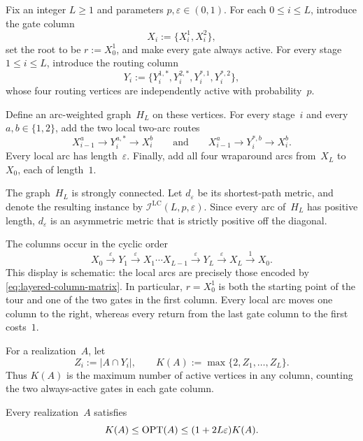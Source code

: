 \documentclass[12pt,a4paper,oneside]{report}
\begin{document}
\begin{construction}\label{con:layered-column}
Fix an integer $L\ge1$ and parameters $p,\varepsilon\in(0,1)$.  For each
$0\le i\le L$, introduce the gate column
\[
    X_i:=\{X_i^1,X_i^2\},
\]
set the root to be $r:=X_0^1$, and make every gate always active.  For every
stage $1\le i\le L$, introduce the routing column
\[
    Y_i:=\{Y_i^{1,\ast},Y_i^{2,\ast},Y_i^{\ast,1},Y_i^{\ast,2}\},
\]
whose four routing vertices are independently active with probability~$p$.

Define an arc-weighted graph~$H_L$ on these vertices.  For every stage~$i$
and every $a,b\in\{1,2\}$, add the two local two-arc routes
\[
    X_{i-1}^a\to Y_i^{a,\ast}\to X_i^b
    \qquad\text{and}\qquad
    X_{i-1}^a\to Y_i^{\ast,b}\to X_i^b.
\]
Every local arc has length~$\varepsilon$.  Finally, add all four wraparound
arcs from~$X_L$ to~$X_0$, each of length~$1$.

The graph~$H_L$ is strongly connected.  Let $d_\varepsilon$ be its
shortest-path metric, and denote the resulting \StochTSP{} instance by
$\mathcal{I}^{\mathrm{LC}}(L,p,\varepsilon)$.  Since every arc of~$H_L$ has
positive length, $d_\varepsilon$ is an asymmetric metric that is strictly
positive off the diagonal.
\end{construction}

The columns occur in the cyclic order
\[
    X_0
    \xrightarrow{\ \varepsilon\ }
    Y_1
    \xrightarrow{\ \varepsilon\ }
    X_1
    \cdots
    X_{L-1}
    \xrightarrow{\ \varepsilon\ }
    Y_L
    \xrightarrow{\ \varepsilon\ }
    X_L
    \xrightarrow{\ 1\ }
    X_0.
\]
This display is schematic: the local arcs are precisely those encoded by
\cref{eq:layered-column-matrix}.  In particular, $r=X_0^1$ is both the starting
point of the tour and one of the two gates in the first column.  Every local
arc moves one column to the right, whereas every return from the last gate
column to the first costs~$1$.

For a realization~$A$, let
\[
    Z_i:=|A\cap Y_i|,
    \qquad
    K(A):=\max\{2,Z_1,\ldots,Z_L\}.
\]
Thus $K(A)$ is the maximum number of active vertices in any column, counting
the two always-active gates in each gate column.

\begin{lemma}
\label{lem:layered-column-realization}
Every realization~$A$ satisfies
\[
    K(A)
    \le
    \operatorname{OPT}(A)
    \le
    (1+2L\varepsilon)K(A).
\]
\end{lemma}
\end{document}
